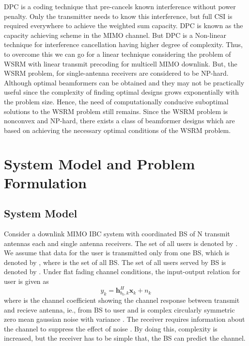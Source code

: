 \ac{DPC} is a coding technique that pre-cancels known interference without power penalty. Only the transmitter needs to know this  interference, but full \ac{CSI} is required everywhere to achieve the weighted sum capacity. \ac{DPC} is known as the capacity achieving scheme in the \ac{MIMO} channel. But \ac{DPC} is a Non-linear technique for interference cancellation having higher degree of complexity. Thus, to overcome this we can go for a linear technique considering the problem of  \ac{WSRM} with linear transmit precoding for multicell  \ac{MIMO} downlink. But, the \ac{WSRM} problem, for single-antenna receivers are considered to be NP-hard. Although optimal beamformers can be obtained and they may not be practically useful since the complexity of finding optimal designs grows exponentially with the problem size. Hence, the need of computationally conducive suboptimal solutions to the WSRM problem still remains. Since the \ac{WSRM} problem is nonconvex and NP-hard, there exists a class of beamformer designs which are based on achieving the necessary optimal conditions of the \ac{WSRM} problem.


\section{System Model and Problem Formulation}

\subsection{System Model}

Consider a downlink \ac{MIMO} \ac{IBC} system with  coordinated \ac{BS} of N transmit antennas each and  single antenna receivers. The set of all  users is denoted by . We assume that data for the  user is transmitted only from one BS, which is denoted by , where  is the set of all \ac{BS}. The set of all users served by BS  is denoted by . Under flat fading channel conditions, the input-output relation for  user is given as
\begin{equation}
y_k = \mathbf{h}_{b_k,k}^H \mathbf{x}_k  + {n}_k
\label{precoder1_eqn}
\end{equation}
where  is the channel coefficient showing the channel response between transmit and recieve antenna, ie., from \ac{BS}  to user  and  is complex circularly symmetric zero mean gaussian noise with variance  . The receiver requires information about the channel   to suppress the effect of noise . By doing this, complexity is increased, but the receiver has to be simple that, the \ac{BS} can predict the channel.

